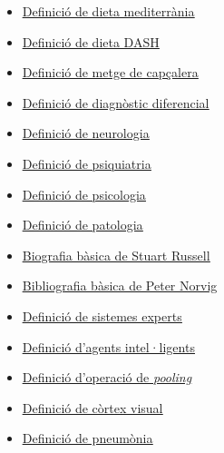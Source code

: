 \documentclass[a4paper,12pt]{article}
\begin{document}
\begin{itemize}
    \item \href{https://medlineplus.gov/spanish/ency/patientinstructions/000110.htm}{\underline{Definició de dieta mediterrània}}
    \item \href{https://medlineplus.gov/spanish/ency/patientinstructions/000784.htm}{\underline{Definició de dieta DASH}}
    \item \href{https://medlineplus.gov/spanish/ency/article/001939.htm}{\underline{Definició de metge de capçalera}}
    \item \href{https://ca.wikipedia.org/wiki/Diagnosi_diferencial}{\underline{Definició de diagnòstic diferencial}}
    \item \href{https://neurologiaclinica.es/neurologo-y-neurologia/#:~:text=La%20neurolog%C3%ADa%20es%20la%20especialidad,la%20especialidad%20cl%C3%ADnica%20por%20excelencia.}{\underline{Definició de neurologia}}
    \item \href{https://www.menteamente.com/psiquiatria-madrid#:~:text=%C2%BFQu%C3%A9%20es%20la%20psiquiatr%C3%ADa%3F,comportamiento%20y%20de%20las%20adicciones.}{\underline{Definició de psiquiatria}}
    \item \href{https://concepto.de/psicologia-3/}{\underline{Definició de psicologia}}
    \item \href{https://accessmedicina.mhmedical.com/content.aspx?bookid=1493&sectionid=102867681}{\underline{Definició de patologia}}
    \item \href{https://en.wikipedia.org/wiki/Stuart_J._Russell}{\underline{Biografia bàsica de Stuart Russell}}
    \item \href{https://en.wikipedia.org/wiki/Peter_Norvig}{\underline{Bibliografia bàsica de Peter Norvig}}
    \item \href{https://www.unir.net/ingenieria/revista/sistema-experto/#:~:text=Los%20sistemas%20expertos%20(SE)%20son,un%20profesional%20en%20la%20materia.}{\underline{Definició de sistemes experts}}
    \item \href{https://www.ceupe.com/blog/agente-inteligente.html}{\underline{Definició d'agents intel·ligents}}
    \item \href{https://keepcoding.io/blog/capas-pooling-red-neuronal-convolucional/#Capas_de_pooling_en_una_red_neuronal_convolucional}{\underline{Definició d'operació de \textit{pooling}}}
    \item \href{https://www.ncbi.nlm.nih.gov/books/NBK482504/#:~:text=The%20visual%20cortex%20is%20the,posterior%20region%20of%20the%20brain.}{\underline{Definició de còrtex visual}}
    \item \href{https://www.nhsinform.scot/illnesses-and-conditions/lungs-and-airways/pneumonia#:~:text=Pneumonia%20is%20swelling%20(inflammation)%20of,and%20fill%20up%20with%20fluid.}{\underline{Definició de pneumònia}}

\end{itemize}
\end{document}
